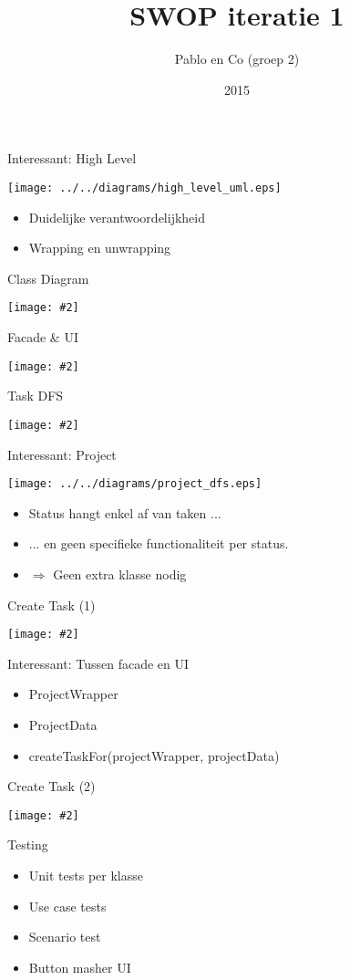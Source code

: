 \documentclass[mathserif,serif]{beamer}
\title{SWOP iteratie 1}
\author{Pablo en Co (groep 2)}
\institute{KU Leuven}
\date{2015}
\newcommand {\framedgraphic}[2] {
    \begin{frame}{#1}
        \begin{center}
            \texttt{[image: \#2]}
        \end{center}
    \end{frame}
}
\begin{document}
 
  \frame{\titlepage}

  \begin{frame}{Interessant: High Level}
      \begin{center}
      \texttt{[image: ../../diagrams/high\_level\_uml.eps]}
        \begin{itemize}
        \item Duidelijke verantwoordelijkheid
        \item Wrapping en unwrapping
        \end{itemize}
      \end{center}
  \end{frame} 
  \framedgraphic{Class Diagram}{../../diagrams/domain_uml.eps}
  \framedgraphic{Facade \& UI}{../../diagrams/facade_uml.eps}
  \framedgraphic{Task DFS}{../../diagrams/task_dfs.eps}
  \begin{frame}{Interessant: Project}
      \begin{center}
      \texttt{[image: ../../diagrams/project\_dfs.eps]}
        \begin{itemize}
        \item Status hangt enkel af van taken ...
        \item ... en geen specifieke functionaliteit per status.
        \item $\Rightarrow$ Geen extra klasse nodig
        \end{itemize}
      \end{center}
  \end{frame} 
  \framedgraphic{Create Task (1)}{../../diagrams/sequence_createTask_uml.eps}
  \begin{frame}{Interessant: Tussen facade en UI}
      \begin{center}
        \begin{itemize}
        \item ProjectWrapper
        \item ProjectData   
        \item createTaskFor(projectWrapper, projectData)
        \end{itemize}
      \end{center}
  \end{frame}
  \framedgraphic{Create Task (2)}{../../diagrams/sequence_createTask_cancel_uml.eps}
  \begin{frame}{Testing}
      \begin{center}
        \begin{itemize}
        \item Unit tests per klasse
        \item Use case tests
        \item Scenario test
        \item Button masher UI
        \end{itemize}
      \end{center}
  \end{frame} 

\end{document}
